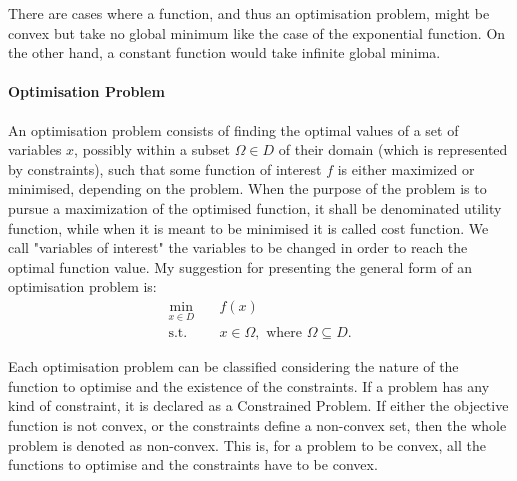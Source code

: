     There are cases where a function, and thus an optimisation problem, might be convex but take no global minimum like the case of the exponential function. On the other hand, a constant function would take infinite global minima. 
    
    \paragraph{Optimisation Problem}
    An optimisation problem consists of finding the optimal values of a set of variables $x$, possibly within a subset $\Omega\in D$ of their domain (which is represented by constraints), such that some function of interest $f$ is either maximized or minimised, depending on the problem. When the purpose of the problem is to pursue a maximization of the optimised function, it shall be denominated utility function, while when it is meant to be minimised it is called cost function. We call "variables of interest" the variables to be changed in order to reach the optimal function value. My suggestion for presenting the general form of an optimisation problem is:
    \begin{align}
        \min_{x\in D} \quad & f(x)\\
        \textrm{s.t.} \quad 
            & x\in\Omega, \text{ where }\Omega\subseteq D.
    \end{align}


    Each optimisation problem can be classified considering the nature of the function to optimise and the existence of the constraints.
    If a problem has any kind of constraint, it is declared as a Constrained Problem. If either the objective function is not convex, or the constraints define a non-convex set, then the whole problem is denoted as non-convex. This is, for a problem to be convex, all the functions to optimise and the constraints have to be convex.
    
